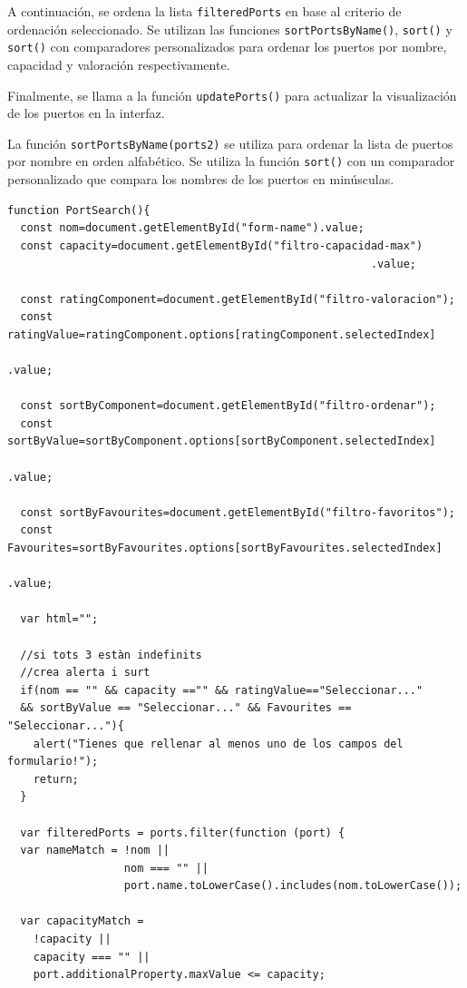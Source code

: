 \documentclass{article}
\begin{document}
\begin{itemize}
    A continuación, se ordena la lista \texttt{filteredPorts} en base al criterio de ordenación seleccionado. Se utilizan las funciones \texttt{sortPortsByName()}, \texttt{sort()} y \texttt{sort()} con comparadores personalizados para ordenar los puertos por nombre, capacidad y valoración respectivamente.
    
    Finalmente, se llama a la función \texttt{updatePorts()} para actualizar la visualización de los puertos en la interfaz.
    
    La función \texttt{sortPortsByName(ports2)} se utiliza para ordenar la lista de puertos por nombre en orden alfabético. Se utiliza la función \texttt{sort()} con un comparador personalizado que compara los nombres de los puertos en minúsculas.
    
    \begin{verbatim}
function PortSearch(){
  const nom=document.getElementById("form-name").value;
  const capacity=document.getElementById("filtro-capacidad-max")
                                                        .value;

  const ratingComponent=document.getElementById("filtro-valoracion");
  const ratingValue=ratingComponent.options[ratingComponent.selectedIndex]
                                                                    .value;

  const sortByComponent=document.getElementById("filtro-ordenar");
  const sortByValue=sortByComponent.options[sortByComponent.selectedIndex]
                                                                  .value;

  const sortByFavourites=document.getElementById("filtro-favoritos");
  const Favourites=sortByFavourites.options[sortByFavourites.selectedIndex]
                                                                    .value;

  var html="";

  //si tots 3 estàn indefinits
  //crea alerta i surt
  if(nom == "" && capacity =="" && ratingValue=="Seleccionar..." 
  && sortByValue == "Seleccionar..." && Favourites == "Seleccionar..."){
    alert("Tienes que rellenar al menos uno de los campos del formulario!");
    return;
  }

  var filteredPorts = ports.filter(function (port) {
  var nameMatch = !nom || 
                  nom === "" || 
                  port.name.toLowerCase().includes(nom.toLowerCase());

  var capacityMatch =
    !capacity || 
    capacity === "" || 
    port.additionalProperty.maxValue <= capacity;


\end{verbatim}
\end{itemize}
\end{document}
